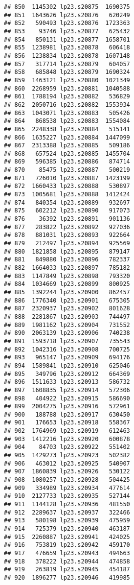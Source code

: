 \documentclass[
]{article}
\begin{document}
\begin{verbatim}
## 850  1145302 lp23.s20875  1690375
## 851  1643626 lp23.s20876   620249
## 852   590493 lp23.s20876  1723363
## 853    93746 lp23.s20877   625432
## 854   850131 lp23.s20877  1658701
## 855  1238981 lp23.s20878   606418
## 856  1238834 lp23.s20878  1607148
## 857   317714 lp23.s20879   604057
## 858   685848 lp23.s20879  1690324
## 859  1463121 lp23.s20880  1021349
## 860  2268959 lp23.s20881  1040588
## 861  1788194 lp23.s20882   536829
## 862  2050716 lp23.s20882  1553934
## 863  1043071 lp23.s20883   505426
## 864   868538 lp23.s20883  1554084
## 865  2248338 lp23.s20884   515141
## 866  1635227 lp23.s20884  1447099
## 867  2313388 lp23.s20885   509186
## 868   657524 lp23.s20885  1455704
## 869   596385 lp23.s20886   874714
## 870    85475 lp23.s20887   500219
## 871   726010 lp23.s20887  1423199
## 872  1660433 lp23.s20888   530897
## 873  1005681 lp23.s20888  1412424
## 874   840354 lp23.s20889   932697
## 875   602212 lp23.s20890   917073
## 876    36392 lp23.s20891   901136
## 877   283822 lp23.s20892   927036
## 878   881031 lp23.s20893   922664
## 879   212497 lp23.s20894   925569
## 880  1821858 lp23.s20895   879147
## 881   849880 lp23.s20896   782337
## 882  1664033 lp23.s20897   785182
## 883  1147849 lp23.s20898   793320
## 884  1034669 lp23.s20899   800925
## 885  1392244 lp23.s20900   862457
## 886  1776340 lp23.s20901   675305
## 887  2320937 lp23.s20902   801628
## 888  2281867 lp23.s20903   744497
## 889  1981162 lp23.s20904   731552
## 890  2063139 lp23.s20906   740238
## 891  1593718 lp23.s20907   735543
## 892  1042316 lp23.s20908   700725
## 893   965147 lp23.s20909   694176
## 894  1589841 lp23.s20910   625046
## 895   349796 lp23.s20912   664369
## 896  1511633 lp23.s20913   586732
## 897  1608835 lp23.s20914   572306
## 898   404922 lp23.s20915   586690
## 899  2004275 lp23.s20916   572961
## 900   188788 lp23.s20917   630450
## 901   176653 lp23.s20918   558367
## 902  1764969 lp23.s20919   612463
## 903  1412216 lp23.s20920   600878
## 904    84703 lp23.s20922   551402
## 905  1429273 lp23.s20923   502382
## 906   463012 lp23.s20925   540907
## 907  1860839 lp23.s20926   530122
## 908  1080257 lp23.s20928   504425
## 909   334989 lp23.s20934   477614
## 910  2127733 lp23.s20935   527144
## 911  1144128 lp23.s20936   481550
## 912  2289637 lp23.s20937   322466
## 913   580198 lp23.s20939   475959
## 914   725379 lp23.s20940   463187
## 915  2260887 lp23.s20941   424025
## 916   753819 lp23.s20942   459170
## 917   476659 lp23.s20943   494663
## 918   378222 lp23.s20944   474858
## 919   263819 lp23.s20945   454187
## 920  1896277 lp23.s20946   419985

\end{verbatim}
\end{document}
